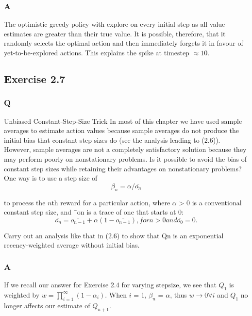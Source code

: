 \subsubsection*{A}
The optimistic greedy policy with explore on every initial step as all value estimates are greater than their true value. It is possible, therefore, that it randomly selects the optimal action and then immediately forgets it in favour of yet-to-be-explored actions. This explains the spike at timestep \(\approx 10\).

\subsection{Exercise 2.7}
\subsubsection*{Q}
Unbiased Constant-Step-Size Trick In most of this chapter we have used sample averages to estimate action values because sample averages do not produce the initial bias that constant step sizes do (see the analysis leading to (2.6)). However, sample averages are not a completely satisfactory solution because they may perform poorly on nonstationary problems. Is it possible to avoid the bias of constant step sizes while retaining their advantages on nonstationary problems? One way is to use a step size of
\begin{equation}
	\beta_n = \alpha / \bar{o_n}
\end{equation}

to process the \(n\)th reward for a particular action, where \(\alpha\) > 0 is a conventional constant step size, and ¯on is a trace of one that starts at 0:
\begin{equation}
	\bar{o_n} = \bar{o_{n-1}} + \alpha(1 - \bar{o_{n-1}}), for n > 0 and \bar{o_0} = 0.
\end{equation}

Carry out an analysis like that in (2.6) to show that Qn is an exponential recency-weighted
average without initial bias.

\subsubsection*{A}
If we recall our answer for Exercise 2.4 for varying stepsize, we see that \(Q_1\) is weighted by \(w = \prod_{i=1}^{\infty} (1 - \alpha_i)\). When \(i\) = 1, \(\beta_n\) = \(\alpha\), thus \(w \rightarrow 0 \forall i\) and \(Q_1\) no longer affects our estimate of \(Q_{n+1}\).

